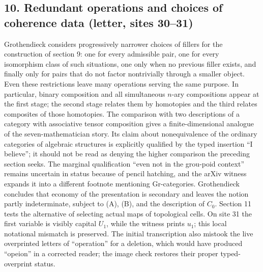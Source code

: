 \documentclass[10pt,oneside]{book}
\begin{document}
\subsection*{10. Redundant operations and choices of coherence data (letter, sites 30--31)}
Grothendieck considers progressively narrower choices of fillers for the construction of section 9: one for every admissible pair, one for every isomorphism class of such situations, one only when no previous filler exists, and finally only for pairs that do not factor nontrivially through a smaller object. Even these restrictions leave many operations serving the same purpose. In particular, binary composition and all simultaneous $n$-ary compositions appear at the first stage; the second stage relates them by homotopies and the third relates composites of those homotopies. The comparison with two descriptions of a category with associative tensor composition gives a finite-dimensional analogue of the seven-mathematician story. Its claim about nonequivalence of the ordinary categories of algebraic structures is explicitly qualified by the typed insertion ``I believe''; it should not be read as denying the higher comparison the preceding section seeks. The marginal qualification ``even not in the grou-poid context'' remains uncertain in status because of pencil hatching, and the arXiv witness expands it into a different footnote mentioning Gr-categories. Grothendieck concludes that economy of the presentation is secondary and leaves the notion partly indeterminate, subject to (A), (B), and the description of $C_0$. Section 11 tests the alternative of selecting actual maps of topological cells. On site 31 the first variable is visibly capital $U_1$, while the witness prints $u_1$; this local notational mismatch is preserved. The initial transcription also mistook the live overprinted letters of ``operation'' for a deletion, which would have produced ``opeion'' in a corrected reader; the image check restores their proper typed-overprint status.
\end{document}

